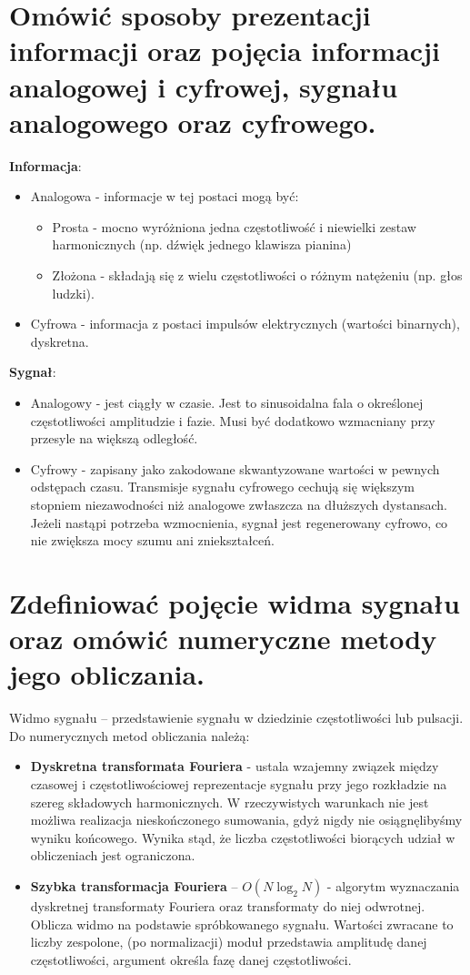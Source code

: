 \documentclass[12pt,a4paper]{article}
\begin{document}
	\section{Omówić sposoby prezentacji informacji oraz pojęcia informacji analogowej i cyfrowej, sygnału analogowego oraz cyfrowego.}
	\textbf{Informacja}:
	\begin{itemize}
		\item Analogowa - informacje w tej postaci mogą być:
		\begin{itemize}
			\item Prosta - mocno wyróżniona jedna częstotliwość i niewielki zestaw harmonicznych (np. dźwięk jednego klawisza pianina)
			\item Złożona - składają się z wielu częstotliwości o różnym natężeniu (np. głos ludzki).
		\end{itemize}
		\item Cyfrowa - informacja z postaci impulsów elektrycznych (wartości binarnych), dyskretna.
	\end{itemize}
	\textbf{Sygnał}:
	\begin{itemize}
		\item Analogowy - jest ciągły w czasie. Jest to sinusoidalna fala o określonej częstotliwości amplitudzie i fazie. Musi być dodatkowo wzmacniany przy przesyle na większą odległość.
		\item Cyfrowy - zapisany jako zakodowane skwantyzowane wartości w pewnych odstępach czasu. Transmisje sygnału cyfrowego cechują się większym stopniem niezawodności niż analogowe zwłaszcza na dłuższych dystansach. Jeżeli nastąpi potrzeba wzmocnienia, sygnał jest regenerowany cyfrowo, co nie zwiększa mocy szumu ani zniekształceń.
	\end{itemize}


	\section{Zdefiniować pojęcie widma sygnału oraz omówić numeryczne metody jego obliczania.}
	Widmo sygnału – przedstawienie sygnału w dziedzinie częstotliwości lub pulsacji. Do numerycznych metod obliczania należą:
	\begin{itemize}
		\item \textbf{Dyskretna transformata Fouriera} - ustala wzajemny związek między czasowej i częstotliwościowej reprezentacje sygnału przy jego  rozkładzie na szereg składowych harmonicznych. W rzeczywistych warunkach nie jest możliwa realizacja nieskończonego sumowania, gdyż nigdy nie osiągnęlibyśmy wyniku końcowego.
Wynika stąd, że liczba częstotliwości biorących udział w obliczeniach jest ograniczona.
		\item \textbf{Szybka transformacja Fouriera} – $O(N\log _{2}N)$ - algorytm wyznaczania dyskretnej transformaty Fouriera oraz transformaty do niej odwrotnej. Oblicza widmo na podstawie spróbkowanego sygnału. Wartości zwracane to liczby zespolone, (po normalizacji) moduł przedstawia amplitudę danej częstotliwości, argument określa fazę danej częstotliwości.
	\end{itemize}
\end{document}
